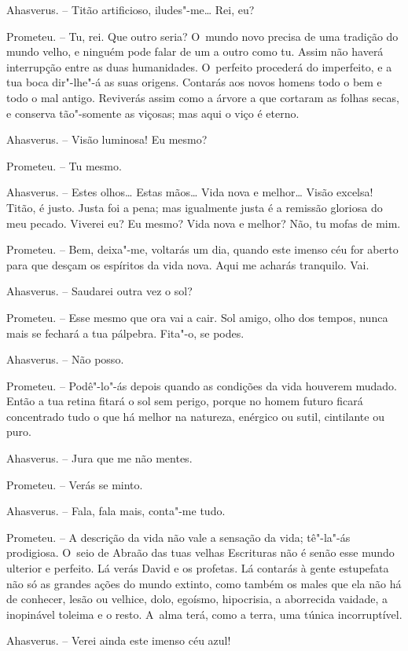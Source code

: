 Ahasverus. -- Titão artificioso, iludes"-me\ldots{} Rei, eu?

Prometeu. -- Tu, rei. Que outro seria? O~mundo novo precisa de uma
tradição do mundo velho, e ninguém pode falar de um a outro como tu.
Assim não haverá interrupção entre as duas humanidades. O~perfeito
procederá do imperfeito, e a tua boca dir"-lhe"-á as suas origens.
Contarás aos novos homens todo o bem e todo o mal antigo. Reviverás
assim como a árvore a que cortaram as folhas secas, e conserva
tão"-somente as viçosas; mas aqui o viço é eterno.

Ahasverus. -- Visão luminosa! Eu mesmo?

Prometeu. -- Tu mesmo.

Ahasverus. -- Estes olhos\ldots{} Estas mãos\ldots{} Vida nova e melhor\ldots{} Visão
excelsa! Titão, é justo. Justa foi a pena; mas igualmente justa é a
remissão gloriosa do meu pecado. Viverei eu? Eu mesmo? Vida nova e
melhor? Não, tu mofas de mim.

Prometeu. -- Bem, deixa"-me, voltarás um dia, quando este imenso céu for
aberto para que desçam os espíritos da vida nova. Aqui me acharás
tranquilo. Vai.

Ahasverus. -- Saudarei outra vez o sol?

Prometeu. -- Esse mesmo que ora vai a cair. Sol amigo, olho dos tempos,
nunca mais se fechará a tua pálpebra. Fita"-o, se podes.

Ahasverus. -- Não posso.

Prometeu. -- Podê"-lo"-ás depois quando as condições da vida houverem
mudado. Então a tua retina fitará o sol sem perigo, porque no homem
futuro ficará concentrado tudo o que há melhor na natureza, enérgico ou
sutil, cintilante ou puro.

Ahasverus. -- Jura que me não mentes.

Prometeu. -- Verás se minto.

Ahasverus. -- Fala, fala mais, conta"-me tudo.

Prometeu. -- A descrição da vida não vale a sensação da vida; tê"-la"-ás
prodigiosa. O~seio de Abraão das tuas velhas Escrituras não é senão esse
mundo ulterior e perfeito. Lá verás David e os profetas. Lá contarás à
gente estupefata não só as grandes ações do mundo extinto, como também
os males que ela não há de conhecer, lesão ou velhice, dolo, egoísmo,
hipocrisia, a aborrecida vaidade, a inopinável toleima e o resto. A~alma
terá, como a terra, uma túnica incorruptível.

Ahasverus. -- Verei ainda este imenso céu azul!

